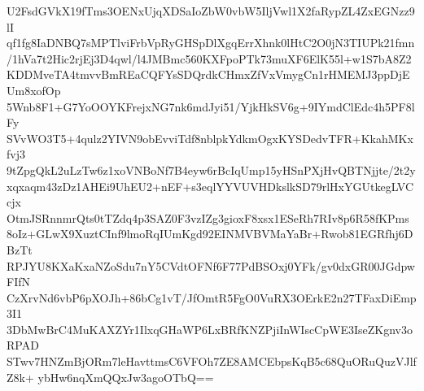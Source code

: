 U2FsdGVkX19fTms3OENxUjqXDSaIoZbW0vbW5IljVwl1X2faRypZL4ZxEGNzz9lI
qf1fg8IaDNBQ7sMPTlviFrbVpRyGHSpDlXgqErrXhnk0lHtC2O0jN3TIUPk21fmn
/1hVa7t2Hic2rjEj3D4qwl/l4JMBmc560KXFpoPTk73muXF6ElK55l+w1S7bA8Z2
KDDMveTA4tmvvBmREaCQFYsSDQrdkCHmxZfVxVmygCn1rHMEMJ3ppDjEUm8xofOp
5Wnb8F1+G7YoOOYKFrejxNG7nk6mdJyi51/YjkHkSV6g+9IYmdClEdc4h5PF8lFy
SVvWO3T5+4qulz2YIVN9obEvviTdf8nblpkYdkmOgxKYSDedvTFR+KkahMKxfvj3
9tZpgQkL2uLzTw6z1xoVNBoNf7B4eyw6rBcIqUmp15yHSnPXjHvQBTNjjte/2t2y
xqxaqm43zDz1AHEi9UhEU2+nEF+s3eqlYYVUVHDkslkSD79rlHxYGUtkegLVCcjx
OtmJSRnnmrQts0tTZdq4p3SAZ0F3vzIZg3gioxF8xsx1ESeRh7RIv8p6R58fKPms
8oIz+GLwX9XuztCInf9lmoRqIUmKgd92EINMVBVMaYaBr+Rwob81EGRfhj6DBzTt
RPJYU8KXaKxaNZoSdu7nY5CVdtOFNf6F77PdBSOxj0YFk/gv0dxGR00JGdpwFIfN
CzXrvNd6vbP6pXOJh+86bCg1vT/JfOmtR5FgO0VuRX3OErkE2n27TFaxDiEmp3I1
3DbMwBrC4MuKAXZYr1IlxqGHaWP6LxBRfKNZPjiInWIscCpWE3IseZKgnv3oRPAD
STwv7HNZmBjORm7leHavttmsC6VFOh7ZE8AMCEbpsKqB5c68QuORuQuzVJlfZ8k+
ybHw6nqXmQQxJw3agoOTbQ==
